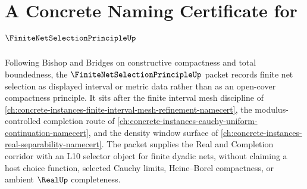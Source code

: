 \chapter{A Concrete Naming Certificate for $\FiniteNetSelectionPrincipleUp$}
\label{ch:concrete-instances-finite-net-selection-principle-namecert}

Following Bishop and Bridges on constructive compactness and total boundedness, the $\FiniteNetSelectionPrincipleUp$ packet records finite net selection as displayed interval or metric data rather than as an open-cover compactness principle. It sits after the finite interval mesh discipline of \autoref{ch:concrete-instances-finite-interval-mesh-refinement-namecert}, the modulus-controlled completion route of \autoref{ch:concrete-instances-cauchy-uniform-continuation-namecert}, and the density window surface of \autoref{ch:concrete-instances-real-separability-namecert}. The packet supplies the Real and Completion corridor with an L10 selector object for finite dyadic nets, without claiming a host choice function, selected Cauchy limits, Heine--Borel compactness, or ambient $\RealUp$ completeness.

